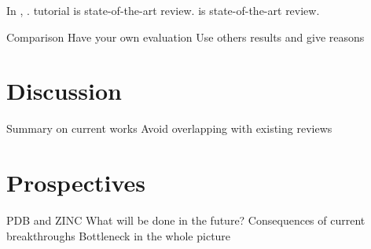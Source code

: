 \documentclass[12pt,conference,compsocconf]{../IEEEtran}
\begin{document}
In \citeyear{1079},  \citep{1079}.
\citep{1080}
\citep{1103} tutorial
\citep{1081} is state-of-the-art review.
\citep{1082} is state-of-the-art review.

Comparison
Have your own evaluation
Use others results and give reasons

\section{Discussion}

Summary on current works
  Avoid overlapping with existing reviews

\section{Prospectives}

PDB \citep{105} and ZINC \citep{532}
What will be done in the future?
  Consequences of current breakthroughs
  Bottleneck in the whole picture



\end{document}

